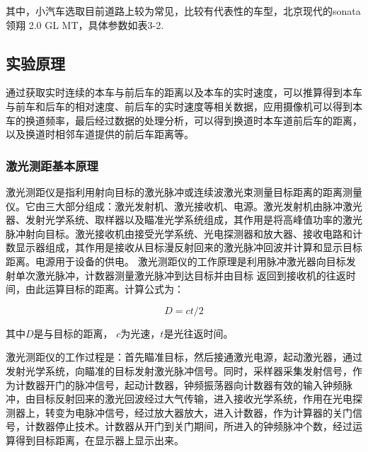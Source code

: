 其中，小汽车选取目前道路上较为常见，比较有代表性的车型，北京现代的sonata领翔 2.0 GL MT，具体参数如表3-2.

\subsection{实验原理}
通过获取实时连续的本车与前后车的距离以及本车的实时速度，可以推算得到本车与前车和后车的相对速度、前后车的实时速度等相关数据，应用摄像机可以得到本车的换道频率，最后经过数据的处理分析，可以得到换道时本车道前后车的距离，以及换道时相邻车道提供的前后车距离等。
\subsubsection{激光测距基本原理}
激光测距仪是指利用射向目标的激光脉冲或连续波激光束测量目标距离的距离测量仪。它由三大部分组成：激光发射机、激光接收机、电源。激光发射机由脉冲激光器、发射光学系统、取样器以及瞄准光学系统组成，其作用是将高峰值功率的激光脉冲射向目标。激光接收机由接受光学系统、光电探测器和放大器、接收电路和计数显示器组成，其作用是接收从目标漫反射回来的激光脉冲回波并计算和显示目标距离。电源用于设备的供电。
激光测距仪的工作原理是利用脉冲激光器向目标发射单次激光脉冲，计数器测量激光脉冲到达目标并由目标 返回到接收机的往返时间，由此运算目标的距离。计算公式为：

\begin{equation}
D = ct/2
\end{equation}

其中$D$是与目标的距离， $c$为光速，$t$是光往返时间。

激光测距仪的工作过程是：首先瞄准目标，然后接通激光电源，起动激光器，通过发射光学系统，向瞄准的目标发射激光脉冲信号。同时，采样器采集发射信号，作为计数器开门的脉冲信号，起动计数器，钟频振荡器向计数器有效的输入钟频脉冲，由目标反射回来的激光回波经过大气传输，进入接收光学系统，作用在光电探测器上，转变为电脉冲信号，经过放大器放大，进入计数器，作为计算器的关门信号，计数器停止技术。计数器从开门到关门期间，所进入的钟频脉冲个数，经过运算得到目标距离，在显示器上显示出来。



